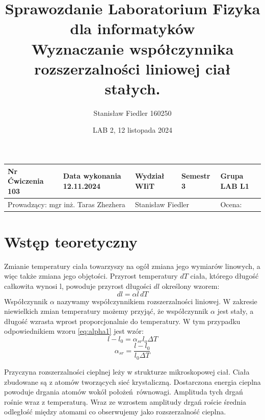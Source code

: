 \documentclass[a4paper, 11pt]{article}
\title{%
        \vspace{-1cm}
       \large Sprawozdanie Laboratorium Fizyka dla informatyków \\
       \huge Wyznaczanie współczynnika rozszerzalności liniowej ciał stałych.}
\author{Stanisław Fiedler 160250}
\date{LAB 2, 12 listopada 2024}
\begin{document}
\begin{table}
	\begin{adjustwidth}{-0.25\textwidth}{-0.25\textwidth}
		\begin{center}
			\begin{tabular}{|l|l|l|l|l|}
				\hline
				Nr Ćwiczenia 103                                             & Data wykonania 12.11.2024                 & Wydział WIiT & Semestr 3 & Grupa LAB L1 \\
				\hline
				\multicolumn{2}{|l|}{ Prowadzący: mgr inż. Taras Zhezhera  } & \multicolumn{2}{|l|}{ Stanisław Fiedler } & Ocena:                                  \\
				\hline
			\end{tabular}
		\end{center}
	\end{adjustwidth}
\end{table}

\maketitle
\tableofcontents

\section{Wstęp teoretyczny}\label{sec:wstep} %
Zmianie temperatury ciała towarzyszy na ogół zmiana jego wymiarów linowych,
a więc także zmiana jego objętości.
Przyrost temperatury $dT$ ciała, którego długość całkowita wynosi l,
powoduje przyrost długości $dl$ określony wzorem:
\begin{equation}\label{eq:alpha1}
	dl = \alpha l\,dT
\end{equation}
Współczynnik $\alpha$ nazywamy współczynnikiem rozszerzalności liniowej.
W zakresie niewielkich zmian temperatury możemy przyjąć, że współczynnik $\alpha$ jest stały,
a długość wzrasta wprost proporcjonalnie do temperatury.
W tym przypadku odpowiednikiem wzoru \eqref{eq:alpha1} jest wzór:
\begin{equation}\label{eq:alpha2}
	l - l_0 = \alpha_{sr}l_o \Delta T
\end{equation}
\begin{equation}\label{eq:alpha3}
	\alpha_{sr} = \frac{l - l_0}{l_0 \Delta T}
\end{equation}

Przyczyna rozszerzalności cieplnej leży w strukturze mikroskopowej ciał.
Ciała zbudowane są z atomów tworzących sieć krystaliczną.
Dostarczona energia cieplna powoduje drgania atomów wokół położeń równowagi.
Amplituda tych drgań rośnie wraz z temperaturą.
Wraz ze wzrostem amplitudy drgań roście średnia odległość między atomami co obserwujemy jako rozszerzalność cieplna.
\end{document}

